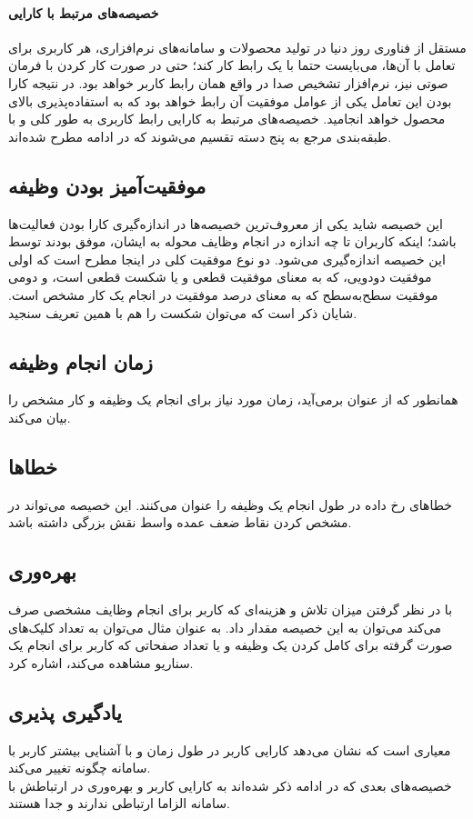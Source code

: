 \paragraph{خصیصه‌های مرتبط با کارایی}
مستقل از فناوری روز دنیا در تولید محصولات و سامانه‌های نرم‌افزاری، هر کاربری برای تعامل با آن‌ها، می‌بایست حتما با یک رابط کار کند؛ حتی در صورت کار کردن با فرمان صوتی نیز، نرم‌افزار تشخیص صدا در واقع همان رابط کاربر خواهد بود. در نتیجه کارا بودن این تعامل یکی از عوامل موفقیت آن رابط خواهد بود که به استفاده‌پذیری بالای محصول خواهد انجامید. خصیصه‌های مرتبط به کارایی رابط کاربری به طور کلی و با طبقه‌بندی مرجع
\cite{albert_measuring_2013}
به پنج دسته تقسیم می‌شوند که در ادامه مطرح شده‌اند.
\subsection{موفقیت‌آمیز بودن وظیفه}
این خصیصه شاید یکی از معروف‌ترین خصیصه‌ها در اندازه‌گیری کارا بودن فعالیت‌ها باشد؛ اینکه کاربران تا چه اندازه در انجام وظایف محوله به ایشان، موفق بودند توسط این خصیصه اندازه‌گیری می‌شود. دو نوع موفقیت کلی در اینجا مطرح است که اولی موفقیت دودویی، که به معنای موفقیت قطعی و یا شکست قطعی است، و دومی موفقیت سطح‌به‌سطح که به معنای درصد موفقیت در انجام یک کار مشخص است. شایان ذکر است که می‌توان شکست را هم با همین تعریف سنجید.
\subsection{زمان انجام وظیفه}
همانطور که از عنوان برمی‌آید، زمان مورد نیاز برای انجام یک وظیفه و کار مشخص را بیان می‌کند.
\subsection{خطاها}
خطاهای رخ داده در طول انجام یک وظیفه را عنوان می‌کنند. این خصیصه می‌تواند در مشخص کردن نقاط ضعف عمده واسط نقش بزرگی داشته باشد.
\subsection{بهره‌وری}
با در نظر گرفتن میزان تلاش و هزینه‌ای که کاربر برای انجام وظایف مشخصی صرف می‌کند می‌توان به این خصیصه مقدار داد. به عنوان مثال می‌توان به تعداد کلیک‌های صورت گرفته برای کامل کردن یک وظیفه و یا تعداد صفحاتی که کاربر برای انجام یک سناریو مشاهده می‌کند، اشاره کرد.
\subsection{یادگیری پذیری}
معیاری است که نشان می‌دهد کارایی کاربر در طول زمان و با آشنایی بیشتر کاربر با سامانه چگونه تغییر می‌کند.\\
خصیصه‌های بعدی که در ادامه ذکر شده‌اند به کارایی کاربر و بهره‌وری در ارتباطش با سامانه الزاما ارتباطی ندارند و جدا هستند.
